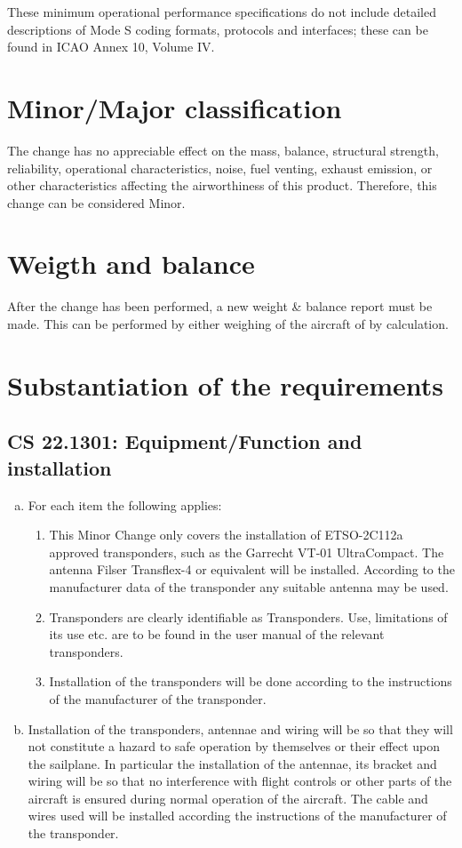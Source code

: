 \documentclass{article}
\begin{document}
These minimum operational performance specifications do not include detailed descriptions of Mode S coding formats, protocols and interfaces; these can be found in ICAO Annex 10, Volume IV. 

\section{Minor/Major classification}
The change has no appreciable effect on the mass, balance, structural strength, reliability, operational characteristics, noise, fuel venting, exhaust emission, or other characteristics affecting the airworthiness of this product. Therefore, this change can be considered Minor.

\section{Weigth and balance}
After the change has been performed, a new weight \& balance report must be made. This can be performed by either weighing of the aircraft of by calculation.

\section{Substantiation of the requirements}

\subsection{CS 22.1301:  Equipment/Function and installation}
\begin{enumerate}[(a)]
\item For each item the following applies:
\begin{enumerate}[(1)]
\item This Minor Change only covers the installation of ETSO-2C112a approved transponders, such as the Garrecht VT-01 UltraCompact. The antenna Filser Transflex-4 or equivalent will be installed. According to the manufacturer data of the transponder any suitable antenna may be used.
\item Transponders are clearly identifiable as Transponders. Use, limitations of its use etc. are to be found in the user manual of the relevant transponders.
\item Installation of the transponders will be done according to the instructions of the manufacturer of the transponder.
\end{enumerate}
\item Installation of the transponders, antennae and wiring will be so that they will not constitute a hazard to safe operation by themselves or their effect upon the sailplane. In particular the installation of the antennae, its bracket and wiring will be so that no interference with flight controls or other parts of the aircraft is ensured during normal operation of the aircraft. The cable and wires used will be installed according the instructions of the manufacturer of the transponder.
\end{enumerate}
\end{document}
